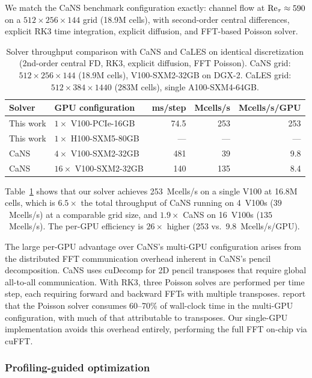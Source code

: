 We match the CaNS benchmark configuration exactly: channel flow at $\mathrm{Re}_\tau \approx 590$ on a $512 \times 256 \times 144$ grid (18.9M cells), with second-order central differences, explicit RK3 time integration, explicit diffusion, and FFT-based Poisson solver.

\begin{table}[htbp]
\centering
\caption{Solver throughput comparison with CaNS \citep{Costa2018} and CaLES \citep{Xiao2024} on identical discretization (2nd-order central FD, RK3, explicit diffusion, FFT Poisson). CaNS grid: $512 \times 256 \times 144$ (18.9M cells), V100-SXM2-32GB on DGX-2. CaLES grid: $512 \times 384 \times 1440$ (283M cells), single A100-SXM4-64GB.}
\label{tab:solver_throughput}
\begin{tabular}{llrrr}
\toprule
Solver & GPU configuration & ms/step & Mcells/s & Mcells/s/GPU \\
\midrule
This work   & $1 \times$ V100-PCIe-16GB  & 74.5  & 253  & 253 \\
This work   & $1 \times$ H100-SXM5-80GB  & ---   & ---  & --- \\
\midrule
CaNS        & $4 \times$ V100-SXM2-32GB  & 481    & 39   & 9.8 \\
CaNS        & $16 \times$ V100-SXM2-32GB & 140    & 135  & 8.4 \\
\bottomrule
\end{tabular}
\end{table}

Table~\ref{tab:solver_throughput} shows that our solver achieves 253~Mcells/s on a single V100 at 16.8M cells, which is $6.5\times$ the total throughput of CaNS running on 4~V100s ($39$~Mcells/s) at a comparable grid size, and $1.9\times$ CaNS on 16~V100s ($135$~Mcells/s).
The per-GPU efficiency is $26\times$ higher (253 vs.\ 9.8~Mcells/s/GPU).

The large per-GPU advantage over CaNS's multi-GPU configuration arises from the distributed FFT communication overhead inherent in CaNS's pencil decomposition.
CaNS uses cuDecomp for 2D pencil transposes that require global all-to-all communication.
With RK3, three Poisson solves are performed per time step, each requiring forward and backward FFTs with multiple transposes.
\citet{Costa2018} report that the Poisson solver consumes 60--70\% of wall-clock time in the multi-GPU configuration, with much of that attributable to transposes.
Our single-GPU implementation avoids this overhead entirely, performing the full FFT on-chip via cuFFT.

\subsubsection{Profiling-guided optimization}


